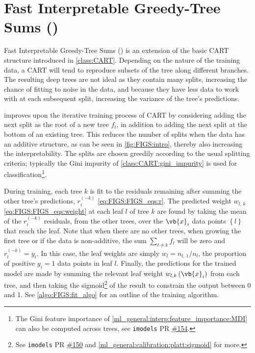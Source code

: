 \section{Fast Interpretable Greedy-Tree Sums (\figs)}
\label{class:FIGS}

Fast Interpretable Greedy-Tree Sums (\figs) \cite{FIGS,G-FIGS}
is an extension of the basic CART structure introduced in \cref{class:CART}.
Depending on the nature of the training data,
a CART will tend to reproduce subsets of the tree along different branches.
The resulting deep trees are not ideal as they contain many splits,
increasing the chance of fitting to noise in the data,
and because they have less data to work with at each subsequent split,
increasing the variance of the tree's predictions.

\figs improves upon the iterative training process of CART
by considering adding the next split as the root of a new tree $f_{t}$,
in addition to adding the next split at the bottom of an existing tree.
This reduces the number of splits when the data has an additive structure,
as can be seen in \cref{fig:FIGS:intro}, thereby also increasing the interpretability.
The splits are chosen greedily according to the usual splitting criteria;
typically the Gini impurity of \cref{class:CART:gini_impurity} is used for classification\footnote{The
Gini feature importance of \cref{ml_general:interp:feature_importance:MDI}
can also be computed across \figs trees, see
\texttt{imodels} PR \href{https://github.com/csinva/imodels/pull/154}{\#154}.}.

During training, each tree $k$ is fit to the residuals remaining after summing the other tree's predictions,
$r_{i}^{\left(-k\right)}$ \cref{eq:FIGS:FIGS_eqs:r}.
The predicted weight $w_{l,\,k}$ \cref{eq:FIGS:FIGS_eqs:weight} at each leaf $l$ of tree $k$
are found by taking the mean of the $r_{i}^{\left(-k\right)}$ residuals, from the other trees,
over the $\vb{x}_{i}$ data points $\left\{l\right\}$ that reach the leaf.
Note that when there are no other trees,
\eg when growing the first tree or if the data is non-additive,
the sum $\sum_{t \neq k} f_{t}$ will be zero and $r_{i}^{\left(-k\right)} = y_{i}$.
In this case, the leaf weights are simply $w_{l} = n_{l,\,1}/n_{l}$,
\ie the proportion of positive $y_{i} = 1$ data points in leaf $l$.
Finally, the predictions for the trained model are made by
summing the relevant leaf weight $w_{l,k}\left(\vb{x}_{i}\right)$ from each tree,
and then taking the sigmoid\footnote{See
\texttt{imodels} PR \href{https://github.com/csinva/imodels/pull/150}{\#150}
and \cref{ml_general:calibration:platt:sigmoid}
for more.} of the result
to constrain the output between \num{0} and \num{1}.
See \cref{algo:FIGS:fit_algo} for an outline of the training algorithm.

